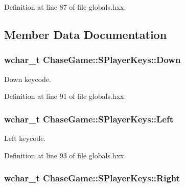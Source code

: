 Definition at line 87 of file globals.\-hxx.



\subsection{Member Data Documentation}
\hypertarget{struct_chase_game_1_1_s_player_keys_abe56af951c133c98b24401542f28ec9b}{
\subsubsection[{Down}]{\setlength{\rightskip}{0pt plus 5cm}wchar\-\_\-t Chase\-Game\-::\-S\-Player\-Keys\-::\-Down}}\label{struct_chase_game_1_1_s_player_keys_abe56af951c133c98b24401542f28ec9b}


Down keycode. 



Definition at line 91 of file globals.\-hxx.

\hypertarget{struct_chase_game_1_1_s_player_keys_ab6c4f7e03fa43cd9443dcbd16a5e3250}{
\subsubsection[{Left}]{\setlength{\rightskip}{0pt plus 5cm}wchar\-\_\-t Chase\-Game\-::\-S\-Player\-Keys\-::\-Left}}\label{struct_chase_game_1_1_s_player_keys_ab6c4f7e03fa43cd9443dcbd16a5e3250}


Left keycode. 



Definition at line 93 of file globals.\-hxx.

\hypertarget{struct_chase_game_1_1_s_player_keys_a17ec0fea68ec78ad4577c6b56b83fa15}{
\subsubsection[{Right}]{\setlength{\rightskip}{0pt plus 5cm}wchar\-\_\-t Chase\-Game\-::\-S\-Player\-Keys\-::\-Right}}\label{struct_chase_game_1_1_s_player_keys_a17ec0fea68ec78ad4577c6b56b83fa15}


